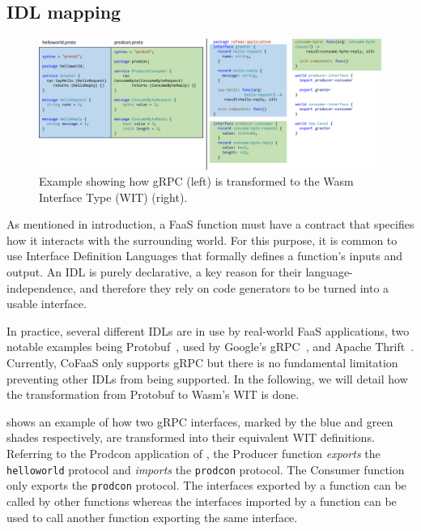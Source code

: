 


\subsection{IDL mapping}
\label{subsec:idl-mapping}

\begin{figure}
  \centering
  \includegraphics[width=\textwidth]{figures/idf_transformation}
  \caption{\label{fig:wit-transformation} Example showing how gRPC (left) is transformed to the Wasm Interface Type (WIT) (right).}
\end{figure}

As mentioned in introduction, a FaaS function must have a contract that specifies how it interacts with the surrounding world. For this purpose, it is common to use Interface Definition Languages that formally defines a function's inputs and output. An IDL is purely declarative, a key reason for their language-independence, and therefore they rely on code generators to be turned into a usable interface.

In practice, several different IDLs are in use by real-world FaaS applications, two notable examples being Protobuf~\cite{protobuf}, used by Google's gRPC~\cite{grpc}, and Apache Thrift~\cite{thrift}. Currently, CoFaaS only supports gRPC but there is no fundamental limitation preventing other IDLs from being supported. In the following, we will detail how the transformation from Protobuf to Wasm's WIT is done.

 shows an example of how two gRPC interfaces, marked by the blue and green shades respectively, are transformed into their equivalent WIT definitions. Referring to the Prodcon application of , the Producer function \emph{exports} the \texttt{helloworld} protocol and \emph{imports} the \texttt{prodcon} protocol. The Consumer function only exports the \texttt{prodcon} protocol. The interfaces exported by a function can be called by other functions whereas the interfaces imported by a function can be used to call another function exporting the same interface.

